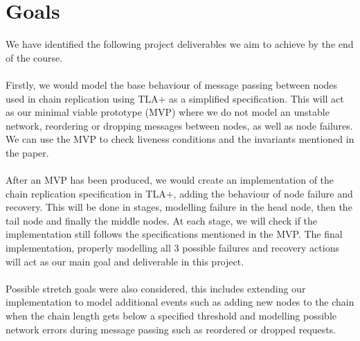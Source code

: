 \section{Goals}
\setcounter{subsection}{0}
\renewcommand*{\thesubsection}{\Alph{subsection}.}

We have identified the following project deliverables we aim to achieve by the end of the course.

\paragraph{}
Firstly, we would model the base behaviour of message passing between nodes used in chain replication using TLA+ as a simplified specification. This will act as our minimal viable prototype (MVP) where we do not model an unstable network, reordering or dropping messages between nodes, as well as node failures. We can use the MVP to check liveness conditions and the invariants mentioned in the paper.

\paragraph{}
After an MVP has been produced, we would create an implementation of the chain replication specification in TLA+, adding the behaviour of node failure and recovery. This will be done in stages, modelling failure in the head node, then the tail node and finally the middle nodes. At each stage, we will check if the implementation still follows the specifications mentioned in the MVP. The final implementation, properly modelling all 3 possible failures and recovery actions will act as our main goal and deliverable in this project.

\paragraph{}
Possible stretch goals were also considered, this includes extending our implementation to model additional events such as adding new nodes to the chain when the chain length gets below a specified threshold and modelling possible network errors during message passing such as reordered or dropped requests.

\paragraph{}

